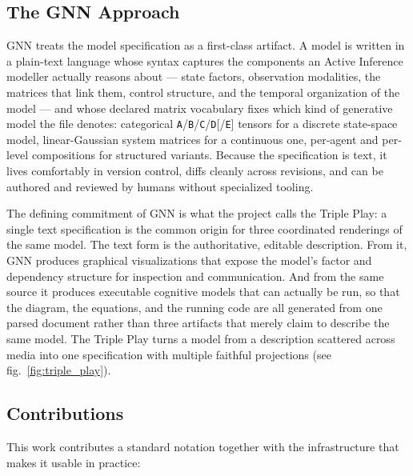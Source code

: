 \documentclass[
  english,
  9pt,
]{extarticle}
\begin{document}
\subsection{The GNN Approach}\label{the-gnn-approach}

GNN treats the model specification as a first-class artifact. A model is
written in a plain-text language whose syntax captures the components an
Active Inference modeller actually reasons about --- state factors,
observation modalities, the matrices that link them, control structure,
and the temporal organization of the model --- and whose declared matrix
vocabulary fixes which kind of generative model the file denotes:
categorical \texttt{A}/\texttt{B}/\texttt{C}/\texttt{D}{[}/\texttt{E}{]}
tensors for a discrete state-space model, linear-Gaussian system
matrices for a continuous one, per-agent and per-level compositions for
structured variants. Because the specification is text, it lives
comfortably in version control, diffs cleanly across revisions, and can
be authored and reviewed by humans without specialized tooling.

The defining commitment of GNN is what the project calls the Triple
Play: a single text specification is the common origin for three
coordinated renderings of the same model. The text form is the
authoritative, editable description. From it, GNN produces graphical
visualizations that expose the model's factor and dependency structure
for inspection and communication. And from the same source it produces
executable cognitive models that can actually be run, so that the
diagram, the equations, and the running code are all generated from one
parsed document rather than three artifacts that merely claim to
describe the same model. The Triple Play turns a model from a
description scattered across media into one specification with multiple
faithful projections (see fig.~\ref{fig:triple_play}).

\subsection{Contributions}\label{contributions}

This work contributes a standard notation together with the
infrastructure that makes it usable in practice:
\end{document}
